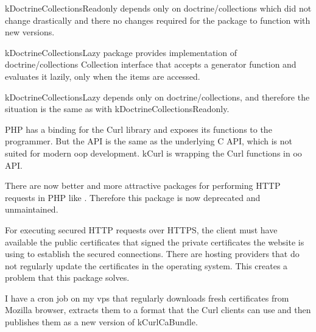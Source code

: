 \gls{kDoctrineCollectionsReadonly} depends only on doctrine/collections which did not change drastically and there no changes required for the package to function with new versions.

 \label{sec:state:doctrine-collections-lazy}

\Gls{kDoctrineCollectionsLazy} package provides implementation of doctrine/collections Collection interface that accepts a generator function and evaluates it lazily, only when the items are accessed.

\gls{kDoctrineCollectionsLazy} depends only on doctrine/collections, and therefore the situation is the same as with \gls{kDoctrineCollectionsReadonly}.




 \label{sec:state:curl}

PHP has a binding for the Curl library and exposes its functions to the programmer. But the API is the same as the underlying C API, which is not suited for modern \gls{oop} development. \gls{kCurl} is wrapping the Curl functions in \gls{oo} API.

There are now better and more attractive packages for performing HTTP requests in PHP like . Therefore this package is now deprecated and unmaintained.

 \label{sec:state:curl-ca-bundle}

For executing secured HTTP requests over HTTPS, the client must have available the public certificates that signed the private certificates the website is using to establish the secured connections. There are hosting providers that do not regularly update the certificates in the operating system. This creates a problem that this package solves.

I have a cron job on my \gls{vps} that regularly downloads fresh certificates from Mozilla browser, extracts them to a format that the Curl clients can use and then publishes them as a new version of \gls{kCurlCaBundle}.

